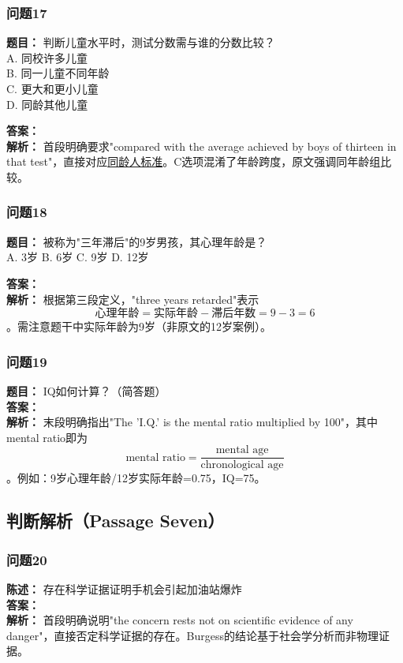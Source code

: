 \documentclass{article}
\begin{document}
\subsubsection*{问题17}
\textbf{题目：} 判断儿童水平时，测试分数需与谁的分数比较？\\
A. 同校许多儿童 \\
B. 同一儿童不同年龄 \\
C. 更大和更小儿童 \\
D. 同龄其他儿童

\textbf{答案：}  \\
\textbf{解析：} 首段明确要求"compared with the average achieved by boys of thirteen in that test"，直接对应\underline{同龄人标准}。C选项混淆了年龄跨度，原文强调同年龄组比较。

\subsubsection*{问题18}
\textbf{题目：} 被称为"三年滞后"的9岁男孩，其心理年龄是？\\
A. 3岁 \quad B. 6岁 \quad C. 9岁 \quad D. 12岁

\textbf{答案：}  \\
\textbf{解析：} 根据第三段定义，"three years retarded"表示\[
\text{心理年龄} = \text{实际年龄} - \text{滞后年数} = 9 - 3 = 6
\]。需注意题干中实际年龄为9岁（非原文的12岁案例）。

\subsubsection*{问题19}
\textbf{题目：} IQ如何计算？（简答题）\\
\textbf{答案：}  \\
\textbf{解析：} 末段明确指出"The 'I.Q.' is the mental ratio multiplied by 100"，其中mental ratio即为\[
\text{mental ratio} = \frac{\text{mental age}}{\text{chronological age}}
\]。例如：9岁心理年龄/12岁实际年龄=0.75，IQ=75。

\subsection*{判断解析（Passage Seven）}

\subsubsection*{问题20}
\textbf{陈述：} 存在科学证据证明手机会引起加油站爆炸 \\
\textbf{答案：}  \\
\textbf{解析：} 首段明确说明"the concern rests not on scientific evidence of any danger"，直接否定科学证据的存在。Burgess的结论基于社会学分析而非物理证据。
\end{document}
